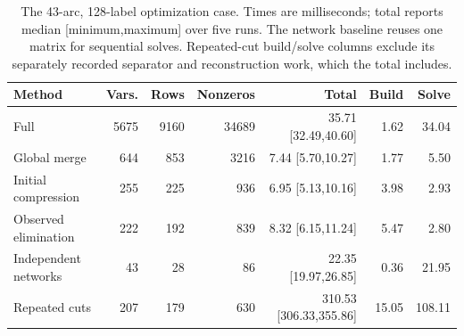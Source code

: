 \begin{table}[tb]\centering\footnotesize
\caption{The 43-arc, 128-label optimization case. Times are milliseconds; total reports median [minimum,maximum] over five runs. The network baseline reuses one matrix for sequential solves. Repeated-cut build/solve columns exclude its separately recorded separator and reconstruction work, which the total includes.}
\label{tab:computation-opt}
\setlength{\tabcolsep}{3pt}
\begin{tabular}{lrrr rrr}\toprule
Method & Vars. & Rows & Nonzeros & Total & Build & Solve\\\midrule
Full & 5675 & 9160 & 34689 & 35.71 [32.49,40.60] & 1.62 & 34.04 \\
Global merge & 644 & 853 & 3216 & 7.44 [5.70,10.27] & 1.77 & 5.50 \\
Initial compression & 255 & 225 & 936 & 6.95 [5.13,10.16] & 3.98 & 2.93 \\
Observed elimination & 222 & 192 & 839 & 8.32 [6.15,11.24] & 5.47 & 2.80 \\
Independent networks & 43 & 28 & 86 & 22.35 [19.97,26.85] & 0.36 & 21.95 \\
Repeated cuts & 207 & 179 & 630 & 310.53 [306.33,355.86] & 15.05 & 108.11 \\
\bottomrule\end{tabular}\end{table}

